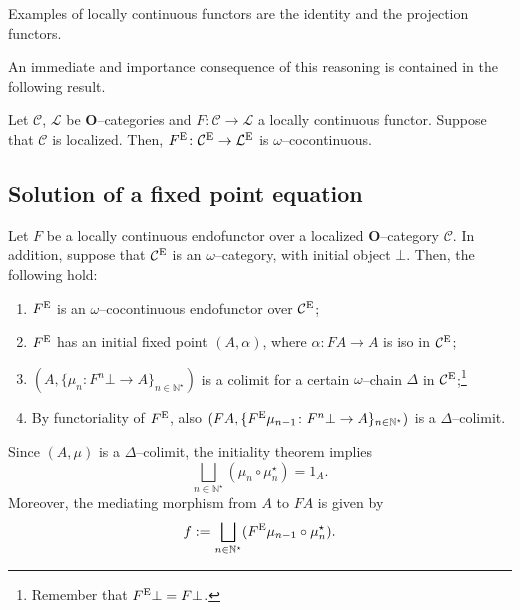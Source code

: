 Examples of locally continuous functors are the identity and the projection functors.

An immediate and importance consequence of this reasoning is contained in the following result.

\begin{thm}
  Let \(\mathcal{C}\), \(\mathcal{L}\) be \(\mathbf{O}\)--categories and \(F \colon \mathcal{C} \to \mathcal{L}\) a locally continuous functor.
  Suppose that \(\mathcal{C}\) is localized.
  Then, \(F^\textup{E} \colon \mathcal{C}^\textup{E} \to \mathcal{L}^\textup{E}\) is \(\omega{}\)--cocontinuous.
\end{thm}

\subsection{Solution of a fixed point equation}

Let \(F\) be a locally continuous endofunctor over a localized \(\mathbf{O}\)--category \(\mathcal{C}\).
In addition, suppose that \(\mathcal{C}^\textup{E}\) is an \(\omega{}\)--category, with initial object \(\bot{}\).
Then, the following hold:
\begin{enumerate}
  \item \(F^\textup{E}\) is an \(\omega{}\)--cocontinuous endofunctor over \(\mathcal{C}^\textup{E}\);
  \item \(F^\textup{E}\) has an initial fixed point \((A,\alpha)\), where \(\alpha \colon FA \to A\) is iso in \(\mathcal{C}^\textup{E}\);
  \item \((A, \lbrace \mu_n \colon F^n\bot \to A \rbrace_{n \in \mathbb{N}^\star})\) is a colimit for a certain \(\omega{}\)--chain \(\Delta{}\) in \(\mathcal{C}^\textup{E}\);\footnote{Remember that \(F^\textup{E}\bot = F\bot{}\).}
  \item By functoriality of \(F^\textup{E}\), also \((FA, \lbrace F^\textup{E}\mu_{n-1} \colon F^n\bot \to A \rbrace_{n \in \mathbb{N}^\star})\) is a \(\Delta{}\)--colimit.
\end{enumerate}
Since \((A,\mu)\) is a \(\Delta{}\)--colimit, the initiality theorem implies
\begin{equation*}
  \bigsqcup_{n \in \mathbb{N}^\star}(\mu_n \circ \mu_n^\star) = 1_A.
\end{equation*}
Moreover, the mediating morphism from \(A\) to \(FA\) is given by
\begin{equation*}
  f := \bigsqcup_{n \in \mathbb{N}^\star}(F^\textup{E}\mu_{n-1} \circ \mu_n^\star).
\end{equation*}

